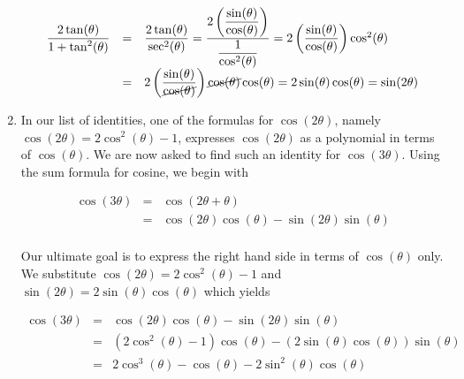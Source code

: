 \documentclass{ximera}
\begin{document}
\begin{example}
\begin{enumerate}
\vspace{-.15in}

\[ \begin{array}{rcl}


\dfrac{2\tan(\theta)}{1 + \tan^{2}(\theta)} & = & \dfrac{2\tan(\theta)}{\sec^{2}(\theta)}= \dfrac{2 \left( \dfrac{\sin(\theta)}{\cos(\theta)}\right)}{\dfrac{1}{\cos^{2}(\theta)}}= 2\left( \dfrac{\sin(\theta)}{\cos(\theta)}\right) \cos^{2}(\theta) \\ [15pt]
																						& = & 2\left( \dfrac{\sin(\theta)}{\cancel{\cos(\theta)}}\right) \cancel{\cos(\theta)} \cos(\theta) = 2\sin(\theta) \cos(\theta) = \sin(2\theta) \\ 

\end{array} \]

\item In our list of identities, one of the formulas for $\cos(2\theta)$, namely $\cos(2\theta) = 2\cos^{2}(\theta) - 1$, expresses $\cos(2\theta)$ as a polynomial in terms of $\cos(\theta)$.  We are  now asked to find such an  identity for $\cos(3\theta)$.  Using the sum formula for cosine, we begin with 

\vspace{-.1in}

\[ \begin{array}{rcl}

\cos(3\theta) & = & \cos(2\theta + \theta) \\ [2pt]
              & = & \cos(2\theta)\cos(\theta) - \sin(2\theta)\sin(\theta) \\
\end{array}\]

Our ultimate goal is to express the right hand side in terms of $\cos(\theta)$ only.  We substitute $\cos(2\theta) = 2\cos^{2}(\theta) -1$ and $\sin(2\theta) = 2\sin(\theta)\cos(\theta)$ which yields

\vspace{-.1in}

\[ \begin{array}{rcl}

\cos(3\theta) & = &  \cos(2\theta)\cos(\theta) - \sin(2\theta)\sin(\theta) \\ [2pt]
              & = & \left(2\cos^{2}(\theta) - 1\right) \cos(\theta) - \left(2 \sin(\theta) \cos(\theta) \right)\sin(\theta) \\ [2pt] 
              & = & 2\cos^{3}(\theta)- \cos(\theta) - 2 \sin^2(\theta) \cos(\theta) \\
              

\end{array}\]
\end{enumerate}
\end{example}
\end{document}
